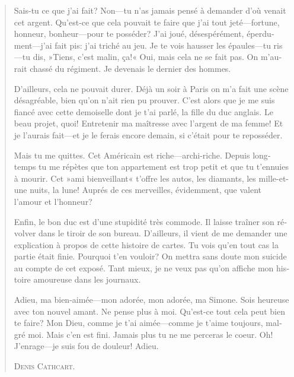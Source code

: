 \begin{quotation}
\begin{french}
Sais-tu ce que j'ai fait? Non\allowbreak---\allowbreak tu n'as jamais pensé à demander d'où
venait cet argent. Qu'est-ce que cela pouvait te faire que j'ai
tout jeté\allowbreak---\allowbreak fortune, honneur, bonheur\allowbreak---\allowbreak pour te posséder? J'ai joué,
désespérément, éperdument\allowbreak---\allowbreak j'ai fait pis: j'ai triché au jeu. Je te
vois hausser les épaules\allowbreak---\allowbreak tu ris\allowbreak---\allowbreak tu dis, »Tiens, c'est malin, ça!«
Oui, mais cela ne se fait pas. On m'aurait chassé du régiment. Je
devenais le dernier des hommes.

D'ailleurs, cela ne pouvait durer. Déjà un soir à Paris on m'a fait
une scène désagréable, bien qu'on n'ait rien pu prouver. C'est alors
que je me suis fiancé avec cette demoiselle dont je t'ai parlé, la
fille du duc anglais. Le beau projet, quoi! Entretenir ma maîtresse
avec l'argent de ma femme! Et je l'aurais fait\allowbreak---\allowbreak et je le ferais encore
demain, si c'était pour te reposséder.

Mais tu me quittes. Cet Américain est riche\allowbreak---\allowbreak archi-riche. Depuis
longtemps tu me répètes que ton appartement est trop petit et que tu
t'ennuies à mourir. Cet »ami bienveillant« t'offre les autos, les
diamants, les mille-et-une nuits, la lune! Auprés de ces merveilles,
évidemment, que valent l'amour et l'honneur?

Enfin, le bon duc est d'une stupidité très commode. Il laisse traîner son révolver dans le tiroir de son bureau. D'ailleurs, il vient de me
demander une explication à propos de cette histoire de cartes. Tu vois
qu'en tout cas la partie était finie. Pourquoi t'en vouloir? On mettra
sans doute mon suicide au compte de cet exposé. Tant mieux, je ne veux
pas qu'on affiche mon histoire amoureuse dans les journaux.

Adieu, ma bien-aimée\allowbreak---\allowbreak mon adorée, mon adorée, ma Simone. Sois
heureuse avec ton nouvel amant. Ne pense plus à moi. Qu'est-ce tout
cela peut bien te faire? Mon Dieu, comme je t'ai aimée\allowbreak---\allowbreak comme je
t'aime toujours, malgré moi. Mais c'en est fini. Jamais plus tu ne me
perceras le coeur. Oh! J'enrage\allowbreak---\allowbreak je suis fou de douleur! Adieu.

\begin{flushright}
\textsc{Denis Cathcart.}
\end{flushright}
\end{french}
\end{quotation}

